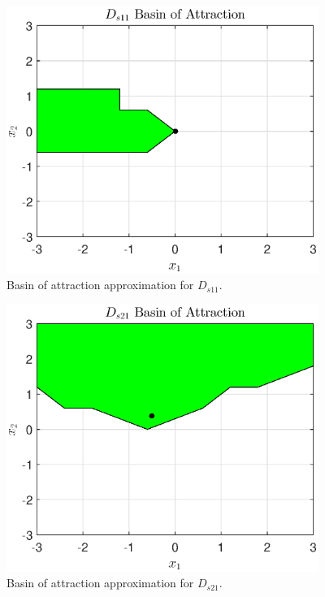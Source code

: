 \documentclass[12pt]{article}
\begin{document}
\begin{figure}[H]
\begin{center}
\includegraphics[width=4in]{Ds11_basin.eps}
\caption{Basin of attraction approximation for $D_{s11}$.}
\label{Ds11_basin}
\end{center}
\end{figure}

\begin{figure}[H]
\begin{center}
\includegraphics[width=4in]{Ds21_basin.eps}
\caption{Basin of attraction approximation for $D_{s21}$.}
\label{Ds21_basin}
\end{center}
\end{figure}





%
%
\end{document}
